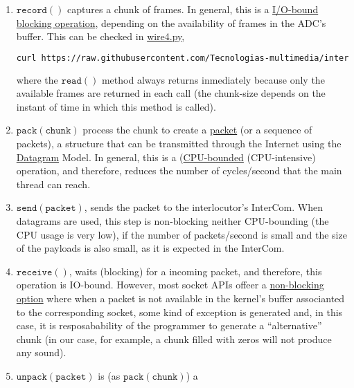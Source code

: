 \begin{enumerate}
\item $\mathtt{record()}$ captures a chunk of frames. In general, this
  is a \href{https://en.wikipedia.org/wiki/I/O_bound}{I/O-bound}
  \href{https://python-sounddevice.readthedocs.io/en/0.4.0/api/streams.html#sounddevice.Stream.read}{blocking
    operation}, depending on the availability of frames in the ADC's
  buffer. This can be checked in
  \href{https://raw.githubusercontent.com/Tecnologias-multimedia/intercom/master/test/sounddevice/wire4.py}{wire4.py},
  \begin{lstlisting}[language=Bash]
    curl https://raw.githubusercontent.com/Tecnologias-multimedia/intercom/master/test/sounddevice/wire4.py > wire4.py
  \end{lstlisting}  
  where the $\mathtt{read()}$ method always returns inmediately
  because only the available frames are returned in each call (the
  chunk-size depends on the instant of time in which this method is
  called).
\item $\mathtt{pack(chunk)}$ process the chunk to create a
  \href{https://en.wikipedia.org/wiki/Network_packet}{packet} (or a
  sequence of packets), a structure that can be transmitted through
  the Internet using the
  \href{https://en.wikipedia.org/wiki/Datagram}{Datagram} Model. In
  general, this is a
  (\href{https://en.wikipedia.org/wiki/CPU-bound}{CPU-bounded}
  (CPU-intensive) operation, and therefore, reduces the number of
  cycles/second that the main thread can reach.
\item $\mathtt{send(packet)}$, sends the packet to the interlocutor's
  InterCom. When datagrams are used, this step is non-blocking neither
  CPU-bounding (the CPU usage is very low), if the number of
  packets/second is small and the size of the payloads is also small,
  as it is expected in the InterCom.
\item $\mathtt{receive()}$, waits (blocking) for a incoming packet,
  and therefore, this operation is IO-bound. However, most socket APIs
  offeer a
  \href{https://docs.python.org/3.8/library/socket.html#socket.socket.setblocking}{non-blocking
    option} where when a packet is not available in the kernel's
  buffer associanted to the corresponding socket, some kind of
  exception is generated and, in this case, it is resposabability of
  the programmer to generate a ``alternative'' chunk (in our case, for
  example, a chunk filled with zeros will not produce any sound).
\item $\mathtt{unpack(packet)}$ is (as $\mathtt{pack(chunk)}$) a

\end{enumerate}
